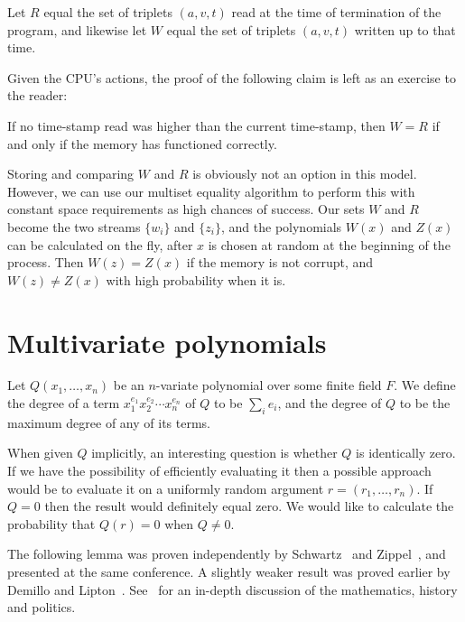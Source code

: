 \documentclass{article}
\begin{document}
Let $R$ equal the set of triplets $(a,v,t)$ read at the time of
termination of the program, and likewise let $W$ equal the set of
triplets $(a,v,t)$ written up to that time.

Given the CPU's actions, the proof of the following claim is left as
an exercise to the reader:
\begin{claim}
  If no time-stamp read was higher than the current time-stamp, then
  $W=R$ if and only if the memory has functioned correctly.
\end{claim}

Storing and comparing $W$ and $R$ is obviously not an option in this
model. However, we can use our multiset equality algorithm to perform
this with constant space requirements as high chances of success. Our
sets $W$ and $R$ become the two streams $\{w_i\}$ and $\{z_i\}$, and
the polynomials $W(x)$ and $Z(x)$ can be calculated on the fly, after
$x$ is chosen at random at the beginning of the process. Then
$W(z) = Z(x)$ if the memory is not corrupt, and $W(z) \neq Z(x)$ with
high probability when it is.


\section{Multivariate polynomials}
Let $Q({x_1, \ldots, x_n})$ be an $n$-variate polynomial over some
finite field $F$. We define the degree of a term $x_1^{e_1}x_2^{e_2}
\cdots x_n^{e_n}$ of $Q$ to be $\sum_i{e_i}$, and the degree of $Q$ to
be the maximum degree of any of its terms.

When given $Q$ implicitly, an interesting question is whether $Q$ is
identically zero. If we have the possibility of efficiently evaluating
it then a possible approach would be to evaluate it on a uniformly
random argument $r = (r_1, \ldots, r_n)$. If $Q = 0$ then the result
would definitely equal zero. We would like to calculate the
probability that $Q(r) = 0$ when $Q \neq 0$.

The following lemma was proven independently by
Schwartz~\cite{Schwartz:1980} and Zippel~\cite{Zippel:1979}, and
presented at the same conference. A slightly weaker result was proved
earlier by Demillo and
Lipton~\cite{DemilloLipton:1978}. See~\cite{LiptonBlog} for an
in-depth discussion of the mathematics, history and politics.
\end{document}
